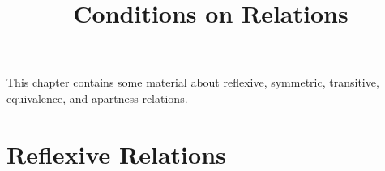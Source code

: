 

%



\title{Conditions on Relations}

\maketitle

\label{section-phantom}

This chapter contains some material about reflexive, symmetric, transitive, equivalence, and apartness relations.

\ChapterTableOfContents

\section{Reflexive Relations}\label{section-reflexive-relations}
